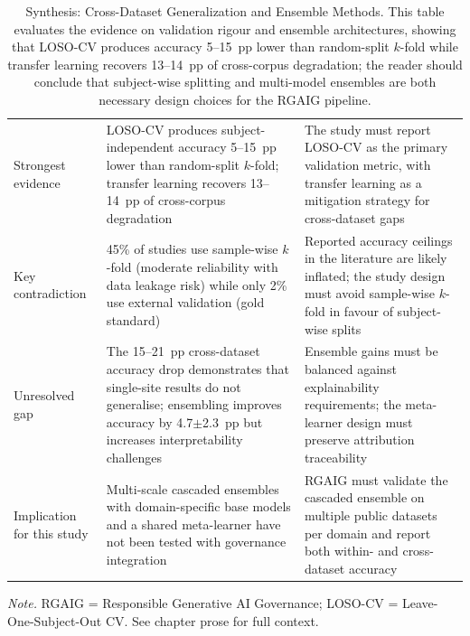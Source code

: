 {\tablestripes\tablefontsize
\begin{xltabular}{\textwidth}{@{} p{2.3cm} p{6.2cm} p{5.9cm} @{}}
\caption[Synthesis: Cross-Dataset Generalization and Ensemble]{Synthesis: Cross-Dataset Generalization and Ensemble Methods. This table evaluates the evidence on validation rigour and ensemble architectures, showing that LOSO-CV produces accuracy 5--15~pp lower than random-split $k$-fold while transfer learning recovers 13--14~pp of cross-corpus degradation; the reader should conclude that subject-wise splitting and multi-model ensembles are both necessary design choices for the RGAIG pipeline.}\label{tab:synth_cross_dataset} \\
\toprule
{} &  &  \\
\midrule
\endfirsthead
\endhead
\bottomrule
\endlastfoot
Strongest evidence & LOSO-CV produces subject-independent accuracy 5--15~pp lower than random-split $k$-fold; transfer learning recovers 13--14~pp of cross-corpus degradation & The study must report LOSO-CV as the primary validation metric, with transfer learning as a mitigation strategy for cross-dataset gaps \\
\addlinespace
Key contradiction & 45\% of studies use sample-wise $k$-fold (moderate reliability with data leakage risk) while only 2\% use external validation (gold standard) & Reported accuracy ceilings in the literature are likely inflated; the study design must avoid sample-wise $k$-fold in favour of subject-wise splits \\
\addlinespace
Unresolved gap & The 15--21~pp cross-dataset accuracy drop demonstrates that single-site results do not generalise; ensembling improves accuracy by 4.7$\pm$2.3~pp but increases interpretability challenges & Ensemble gains must be balanced against explainability requirements; the meta-learner design must preserve attribution traceability \\
\addlinespace
Implication for this study & Multi-scale cascaded ensembles with domain-specific base models and a shared meta-learner have not been tested with governance integration & RGAIG must validate the cascaded ensemble on multiple public datasets per domain and report both within- and cross-dataset accuracy \\
\end{xltabular}}
\vspace{0.3em}\noindent\textit{Note.} RGAIG = Responsible Generative AI Governance; LOSO-CV = Leave-One-Subject-Out CV. See chapter prose for full context.

